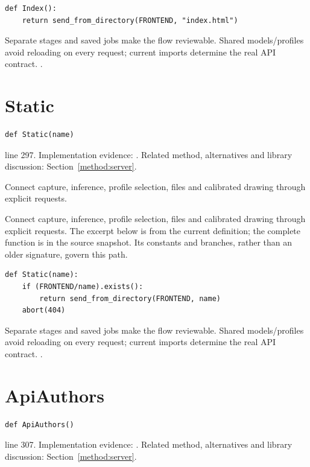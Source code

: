 \begin{lstlisting}[style=plain]
def Index():
    return send_from_directory(FRONTEND, "index.html")
\end{lstlisting}
Separate stages and saved jobs make the flow reviewable. Shared models/profiles avoid reloading on every request; current imports determine the real API contract. \cite{flaskdocs,pillowops,code2026}.


\section{Static}\label{fn:web-server:Static}
\begin{lstlisting}[style=sig]
def Static(name)
\end{lstlisting}
 line 297. Implementation evidence: \cite{code2026}. Related method, alternatives and library discussion: Section~\ref{method:server}.


Connect capture, inference, profile selection, files and calibrated drawing through explicit requests.


Connect capture, inference, profile selection, files and calibrated drawing through explicit requests. The excerpt below is from the current definition; the complete function is in the source snapshot. Its constants and branches, rather than an older signature, govern this path.


\begin{lstlisting}[style=plain]
def Static(name):
    if (FRONTEND/name).exists():
        return send_from_directory(FRONTEND, name)
    abort(404)
\end{lstlisting}
Separate stages and saved jobs make the flow reviewable. Shared models/profiles avoid reloading on every request; current imports determine the real API contract. \cite{flaskdocs,pillowops,code2026}.


\section{ApiAuthors}\label{fn:web-server:ApiAuthors}
\begin{lstlisting}[style=sig]
def ApiAuthors()
\end{lstlisting}
 line 307. Implementation evidence: \cite{code2026}. Related method, alternatives and library discussion: Section~\ref{method:server}.


